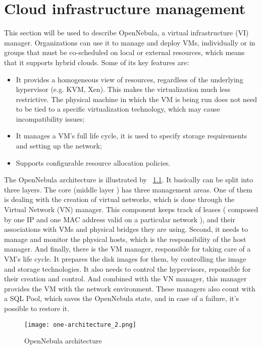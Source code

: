 \chapter{\textbf{Cloud infrastructure management}}


This section will be used to describe OpenNebula, a virtual infrastructure (VI) manager. Organizations can use it to manage and deploy VMs, individually or in groups that must be co-scheduled on local or external resources, which means that it supports hybrid clouds. Some of its key features are:
\begin{itemize}
 \item It provides a homogeneous view of resources, regardless of the underlying hypervisor (e.g. KVM, Xen). This makes the virtualization much less restrictive. The physical machine in which the VM is being run does not need to be tied to a specific virtualization technology, which may cause incompatibility issues;
  \item It manages a VM's full life cycle, it is used to specify storage requirements and setting up the network;
  \item Supports configurable resource allocation policies.
\end{itemize}

The OpenNebula architecture is illustrated by ~\ref{fig:open_arch}. It basically can be split into three layers. The core (middle layer ) has three management areas. One of them is dealing with the creation of virtual networks, which is done through the Virtual Network (VN) manager. This component keeps track of leases ( composed by one IP and one MAC address valid on a particular network ), and their associations with VMs and physical bridges they are using. Second, it needs to manage and monitor the physical hosts, which is the responsibility of the host manager. And finally, there is the VM manager, responsible for taking care of a VM's life cycle. It prepares the disk images for them, by controlling the image and storage technologies. It also needs to control the hypervisors, reponsible for their creation and control. And combined with the VN manager, this manager provides the VM with the network environment. These managers also count with a SQL Pool, which saves the OpenNebula state, and in case of a failure, it's possible to restore it.

\begin{figure}[ht]
  \centering
 \texttt{[image: one-architecture\_2.png]}
  \caption{OpenNebula architecture}
  \label{fig:open_arch}
\end{figure}

